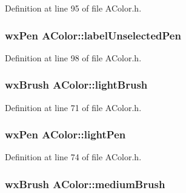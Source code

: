 Definition at line 95 of file A\+Color.\+h.

\subsubsection[{\texorpdfstring{label\+Unselected\+Pen}{labelUnselectedPen}}]{\setlength{\rightskip}{0pt plus 5cm}wx\+Pen A\+Color\+::label\+Unselected\+Pen\hspace{0.3cm}{\ttfamily [static]}}\hypertarget{class_a_color_af42c7ce11d8c08e3ca1342af16829649}{}\label{class_a_color_af42c7ce11d8c08e3ca1342af16829649}


Definition at line 98 of file A\+Color.\+h.

\subsubsection[{\texorpdfstring{light\+Brush}{lightBrush}}]{\setlength{\rightskip}{0pt plus 5cm}wx\+Brush A\+Color\+::light\+Brush\hspace{0.3cm}{\ttfamily [static]}}\hypertarget{class_a_color_a43d85059fec73824a5af8108986fa021}{}\label{class_a_color_a43d85059fec73824a5af8108986fa021}


Definition at line 71 of file A\+Color.\+h.

\subsubsection[{\texorpdfstring{light\+Pen}{lightPen}}]{\setlength{\rightskip}{0pt plus 5cm}wx\+Pen A\+Color\+::light\+Pen\hspace{0.3cm}{\ttfamily [static]}}\hypertarget{class_a_color_a611a29d7cd9e7ccec3fb8d7a7969e918}{}\label{class_a_color_a611a29d7cd9e7ccec3fb8d7a7969e918}


Definition at line 74 of file A\+Color.\+h.

\subsubsection[{\texorpdfstring{medium\+Brush}{mediumBrush}}]{\setlength{\rightskip}{0pt plus 5cm}wx\+Brush A\+Color\+::medium\+Brush\hspace{0.3cm}{\ttfamily [static]}}\hypertarget{class_a_color_a022a54281f5c6e278a49d6e23923be9c}{}\label{class_a_color_a022a54281f5c6e278a49d6e23923be9c}


